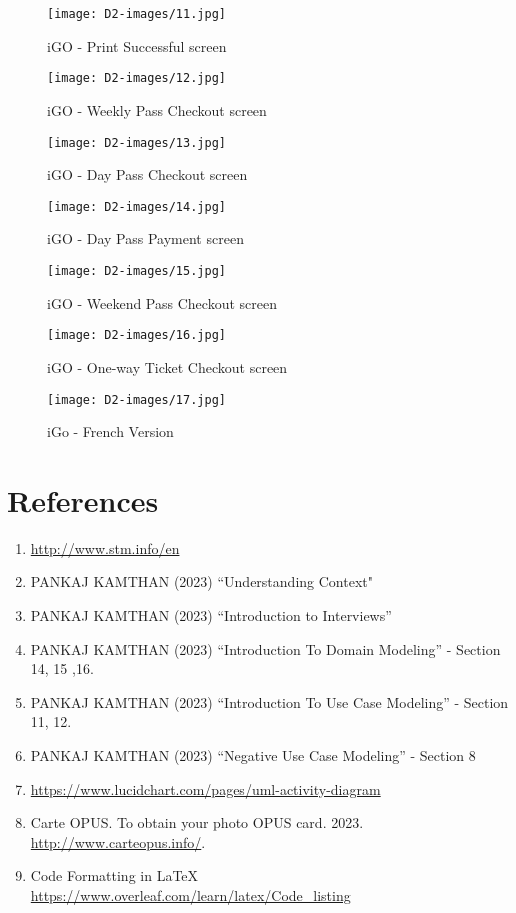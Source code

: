 \documentclass[a4paper,12pt]{report}
\begin{document}
\begin{figure}[h!]
  \centering
   \texttt{[image: D2-images/11.jpg]}
  \caption{iGO - Print Successful screen}
\end{figure}

\begin{figure}[h!]
  \centering
   \texttt{[image: D2-images/12.jpg]}
  \caption{iGO - Weekly Pass Checkout screen}
\end{figure}

\begin{figure}[h!]
  \centering
   \texttt{[image: D2-images/13.jpg]}
  \caption{iGO - Day Pass Checkout screen}
\end{figure}

\begin{figure}[h!]
  \centering
   \texttt{[image: D2-images/14.jpg]}
  \caption{iGO - Day Pass Payment screen}
\end{figure}

\begin{figure}[h!]
  \centering
   \texttt{[image: D2-images/15.jpg]}
  \caption{iGO - Weekend Pass Checkout screen}
\end{figure}


\begin{figure}[h!]
  \centering
   \texttt{[image: D2-images/16.jpg]}
  \caption{iGO - One-way Ticket Checkout screen}
\end{figure}

\begin{figure}[h!]
  \centering
   \texttt{[image: D2-images/17.jpg]}
  \caption{iGo - French Version}
\end{figure}


\chapter{References}
\begin{enumerate}
  \item \url{http://www.stm.info/en}
  \item PANKAJ KAMTHAN (2023) “Understanding Context"
  \item PANKAJ KAMTHAN (2023) “Introduction to Interviews”
  \item PANKAJ KAMTHAN (2023) “Introduction To Domain Modeling” - Section 14, 15 ,16.
  \item PANKAJ KAMTHAN (2023) “Introduction To Use Case Modeling” - Section 11, 12.
  \item PANKAJ KAMTHAN (2023) “Negative Use Case Modeling”  - Section 8
  \item \url{https://www.lucidchart.com/pages/uml-activity-diagram}
  \item Carte OPUS. To obtain your photo OPUS card. 2023. \url{http://www.carteopus.info/}.
  \item Code Formatting in LaTeX \url{https://www.overleaf.com/learn/latex/Code_listing}
\end{enumerate}
\end{document}
